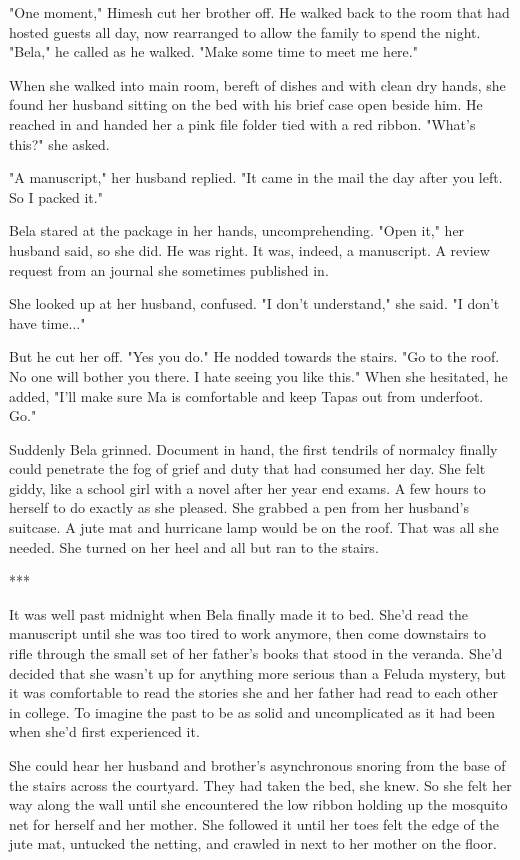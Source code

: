 \documentclass{amsart}
\begin{document}
"One moment," Himesh cut her brother off. He walked back to the room that had hosted guests all day, now rearranged to allow the family to spend the night. "Bela," he called as he walked. "Make some time to meet me here."

When she walked into main room, bereft of dishes and with clean dry hands, she found her husband sitting on the bed with his brief case open beside him. He reached in and handed her a pink file folder tied with a red ribbon. "What's this?" she asked.

"A manuscript," her husband replied. "It came in the mail the day after you left. So I packed it." 

Bela stared at the package in her hands, uncomprehending. "Open it," her husband said, so she did. He was right. It was, indeed, a manuscript. A review request from an journal she sometimes published in.

She looked up at her husband, confused. "I don't understand," she said. "I don't have time..."

But he cut her off. "Yes you do." He nodded towards the stairs. "Go to the roof. No one will bother you there. I hate seeing you like this." When she hesitated, he added, "I'll make sure Ma is comfortable and keep Tapas out from underfoot. Go."

Suddenly Bela grinned. Document in hand, the first tendrils of normalcy finally could penetrate the fog of grief and duty that had consumed her day. She felt giddy, like a school girl with a novel after her year end exams. A few hours to herself to do exactly as she pleased. She grabbed a pen from her husband's suitcase. A jute mat and hurricane lamp would be on the roof. That was all she needed. She turned on her heel and all but ran to the stairs.  

\begin{center} *** \end{center}

It was well past midnight when Bela finally made it to bed. She'd read the manuscript until she was too tired to work anymore, then come downstairs to rifle through the small set of her father's books that stood in the veranda. She'd decided that she wasn't up for anything more serious than a Feluda mystery, but it was comfortable to read the stories she and her father had read to each other in college. To imagine the past to be as solid and uncomplicated as it had been when she'd first experienced it.

She could hear her husband and brother's asynchronous snoring from the base of the stairs across the courtyard. They had taken the bed, she knew. So she felt her way along the wall until she encountered the low ribbon holding up the mosquito net for herself and her mother. She followed it until her toes felt the edge of the jute mat, untucked the netting, and crawled in next to her mother on the floor.
\end{document}
